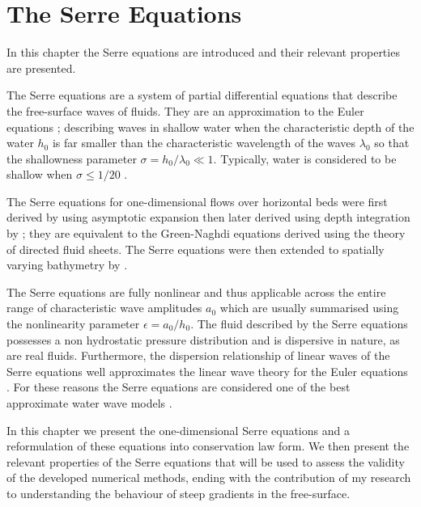 
\chapter{The Serre Equations}
\label{chp:Serreeqns}
In this chapter the Serre equations are introduced and their relevant properties are presented.

The Serre equations are a system of partial differential equations that describe the free-surface waves of fluids. They are an approximation to the Euler equations \cite{Euler-1755-274}; describing waves in shallow water when the characteristic depth of the water $h_0$ is far smaller than the characteristic wavelength of the waves $\lambda_0$ so that the shallowness parameter $ \sigma = h_0 / \lambda_0  \ll 1 $. Typically, water is considered to be shallow when $\sigma  \le  1/ 20$ \cite{Sorenson-2006}.  

The Serre equations for one-dimensional flows over horizontal beds were first derived by \citet{Serre-F-1953-857} using asymptotic expansion then later derived using depth integration by \citet{Su-Gardener-1969-536}; they are equivalent to the Green-Naghdi equations \cite{Green-Naghdi-1976-237} derived using the theory of directed fluid sheets. The Serre equations were then extended to spatially varying bathymetry by \citet{Seabra-Santos-etal-1987-117}. 

The Serre equations are fully nonlinear and thus applicable across the entire range of characteristic wave amplitudes $a_0$ which are usually summarised using the nonlinearity parameter $\epsilon = a_0 / h_0$. The fluid described by the Serre equations possesses a non hydrostatic pressure distribution and is dispersive in nature, as are real fluids. Furthermore, the dispersion relationship of linear waves of the Serre equations well approximates the linear wave theory for the Euler equations \cite{Barthelemy-2004-315}. For these reasons the Serre equations are considered one of the best approximate water wave models \cite{Bonneton-Lannes-2009-16601,Bonneton-etal-2011-1479}. 

In this chapter we present the one-dimensional Serre equations and a reformulation of these equations into conservation law form. We then present the relevant properties of the Serre equations that will be used to assess the validity of the developed numerical methods, ending with the contribution of my research to understanding the behaviour of steep gradients in the free-surface. 

